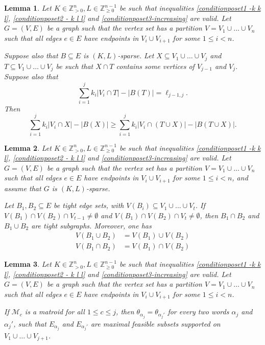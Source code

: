 \documentclass[10pt,a4paper]{amsart}
\newtheorem{lemma}{Lemma}
\begin{document}
\begin{lemma}\label{Increase_when_tight - greedoids}
Let $K\in \mathbb{Z}_{>0}^{n}, L\in \mathbb{Z}_{\geq 0}^{n-1}$ be such that inequalities \eqref{conditionposet1 -k k l}, \eqref{conditionposet2 - k l l} and \eqref{conditionposet3-increasing} are valid. Let $G=(V,E)$ be a graph such that the vertex set has a partition $V=V_1\cup \dots \cup V_n$ such that all edges $e\in E$ have endpoints in $V_{i} \cup V_{i+1}$ for some $1 \leq i < n$. 

Suppose also that $B \subseteq E$ is $(K,L)$-sparse. Let $X\subseteq V_{1}\cup \dots \cup V_{j}$ and $T \subseteq V_{1}\cup \dots \cup V_{j}$ be such that $X\cap T$ contains some vertices of $V_{j-1}$ and $V_{j}$. Suppose also that
\begin{equation*}
\sum_{i=1}^{j} k_i |V_i\cap T| - |B(T)|  = \ell_{j-1, j}. 
\end{equation*}
Then
\begin{equation*}
\sum_{i=1}^{j} k_i |V_i \cap X| - |B(X)|  \geq \sum_{i=1}^{j} k_i |V_i\cap (T\cup X)| - |B(T\cup X)|. 
\end{equation*}
\end{lemma}

\begin{lemma}\label{blocks}
Let $K\in \mathbb{Z}_{>0}^{n}, L\in \mathbb{Z}_{\geq 0}^{n-1}$ be such that inequalities \eqref{conditionposet1 -k k l}, \eqref{conditionposet2 - k l l} and \eqref{conditionposet3-increasing} are valid. Let $G=(V,E)$ be a graph such that the vertex set has a partition $V=V_1\cup \dots \cup V_n$ such that all edges $e\in E$ have endpoints in $V_{i} \cup V_{i+1}$ for some $1 \leq i < n$, and assume that $G$ is $(K,L)$-sparse. 

Let $B_1, B_2 \subseteq E$ be tight edge sets, with $V(B_i)\subseteq V_1\cup \dots \cup V_t$. If $V(B_1)\cap V(B_2) \cap V_{t-1} \neq \emptyset$ and $V(B_1)\cap V(B_2) \cap V_{t} \neq \emptyset$, then $B_1 \cap B_2$ and $B_1\cup B_2$ are tight subgraphs.
Moreover, one has
\begin{align*}
    V(B_1\cup B_2) &= V(B_1) \cup V(B_2)\\
    V(B_1\cap B_2) &= V(B_1) \cap V(B_2)
\end{align*}
\end{lemma}

\begin{lemma}
    Let $K\in \mathbb{Z}_{>0}^{n}, L\in \mathbb{Z}_{\geq 0}^{n-1}$ be such that inequalities \eqref{conditionposet1 -k k l}, \eqref{conditionposet2 - k l l} and \eqref{conditionposet3-increasing} are valid. Let $G=(V,E)$ be a graph such that the vertex set has a partition $V=V_1\cup \dots \cup V_n$ such that all edges $e\in E$ have endpoints in $V_{i} \cup V_{i+1}$ for some $1 \leq i < n$. 
    
    If $\mathcal{M}_c$ is a matroid for all $1 \leq c\leq j$, then $\theta_{\alpha_j} = \theta_{\alpha_j'}$ for every two words $\alpha_j$ and $\alpha_j'$, such that $E_{\alpha_j}$ and $E_{\alpha_j'}$ are maximal feasible subsets supported on $V_1\cup \dots \cup V_{j+1}$. 
    \label{surplus-independent}
\end{lemma}
\end{document}

